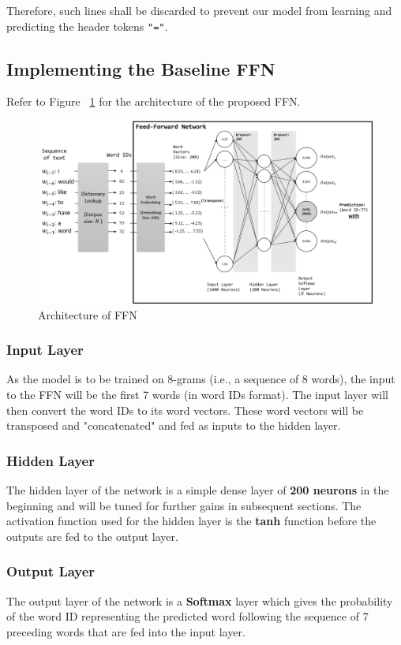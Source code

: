 \documentclass[sigconf,nonacm=true]{acmart}
\begin{document}
Therefore, such lines shall be discarded to prevent our model from learning 
and predicting the header tokens \verb|"="|.


\subsection{Implementing the Baseline FFN}

Refer to Figure ~\ref{fig:ffnarch} for the architecture of the proposed FFN.

\begin{figure}
	\centering
	\includegraphics[scale=0.52]{figures/ffn.png}
	\caption{Architecture of FFN}
	\label{fig:ffnarch}
	
\end{figure}


\subsubsection{Input Layer}
As the model is to be trained on 8-grams (i.e., a sequence of 8 words),
the input to the FFN will be the first 7 words (in word IDs format). The
input layer will then convert the word IDs to its word vectors.
These word vectors will be transposed and "concatenated" and fed as 
inputs to the hidden layer.

\subsubsection{Hidden Layer}
The hidden layer of the network is a simple dense layer of 
\textbf{200 neurons} in the beginning and will be tuned for further gains 
in subsequent sections. The activation function used for the hidden layer 
is the \textbf{tanh} function before the outputs are fed to the output layer.

\subsubsection{Output Layer}
The output layer of the network is a \textbf{Softmax} layer which gives 
the probability of the word ID representing the predicted word following 
the sequence of 7 preceding words that are fed into the input layer.
\end{document}
